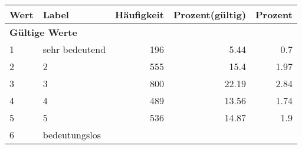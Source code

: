      \begin{longtable}{lXrrr}
     \toprule
     \textbf{Wert} & \textbf{Label} & \textbf{Häufigkeit} & \textbf{Prozent(gültig)} & \textbf{Prozent} \\
     \endhead
     \midrule
     \multicolumn{5}{l}{\textbf{Gültige Werte}}\\

     1 &
     \multicolumn{1}{X}{ sehr bedeutend   } &


       \num{196} &
       \num[round-mode=places,round-precision=2]{5,44} &
         \num[round-mode=places,round-precision=2]{0,7} \\

     2 &
     \multicolumn{1}{X}{ 2   } &


       \num{555} &
       \num[round-mode=places,round-precision=2]{15,4} &
         \num[round-mode=places,round-precision=2]{1,97} \\

     3 &
     \multicolumn{1}{X}{ 3   } &


       \num{800} &
       \num[round-mode=places,round-precision=2]{22,19} &
         \num[round-mode=places,round-precision=2]{2,84} \\

     4 &
     \multicolumn{1}{X}{ 4   } &


       \num{489} &
       \num[round-mode=places,round-precision=2]{13,56} &
         \num[round-mode=places,round-precision=2]{1,74} \\

     5 &
     \multicolumn{1}{X}{ 5   } &


       \num{536} &
       \num[round-mode=places,round-precision=2]{14,87} &
         \num[round-mode=places,round-precision=2]{1,9} \\

     6 &
     \multicolumn{1}{X}{ bedeutungslos   } &



\end{longtable}

